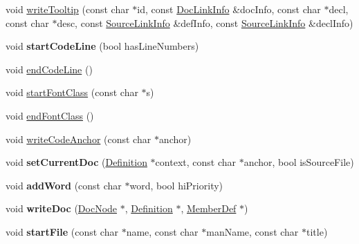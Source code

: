 \begin{DoxyCompactItemize}
void \mbox{\hyperlink{class_html_generator_ad21a9b170d8f644619f287a233c6b549}{write\+Tooltip}} (const char $\ast$id, const \mbox{\hyperlink{struct_doc_link_info}{Doc\+Link\+Info}} \&doc\+Info, const char $\ast$decl, const char $\ast$desc, const \mbox{\hyperlink{struct_source_link_info}{Source\+Link\+Info}} \&def\+Info, const \mbox{\hyperlink{struct_source_link_info}{Source\+Link\+Info}} \&decl\+Info)
\item 
\mbox{\label{class_html_generator_ab89f82b354a626585bf1ff5a793ad5db}} 
void {\bfseries start\+Code\+Line} (bool has\+Line\+Numbers)
\item 
void \mbox{\hyperlink{class_html_generator_a509e9b78f035f58e533cef4f79bf5401}{end\+Code\+Line}} ()
\item 
void \mbox{\hyperlink{class_html_generator_aa600cc24896060a68612e3db6efb7dbf}{start\+Font\+Class}} (const char $\ast$s)
\item 
void \mbox{\hyperlink{class_html_generator_aca25e58aa19b44b41de489dc966e4b5d}{end\+Font\+Class}} ()
\item 
void \mbox{\hyperlink{class_html_generator_a9e2528347c04b6f07dd9263441dbcf4f}{write\+Code\+Anchor}} (const char $\ast$anchor)
\item 
\mbox{\label{class_html_generator_a36829b23efe3855373db99bac3e9998d}} 
void {\bfseries set\+Current\+Doc} (\mbox{\hyperlink{class_definition}{Definition}} $\ast$context, const char $\ast$anchor, bool is\+Source\+File)
\item 
\mbox{\label{class_html_generator_ab80e35069bed2aadfd28912897ff59c8}} 
void {\bfseries add\+Word} (const char $\ast$word, bool hi\+Priority)
\item 
\mbox{\label{class_html_generator_afb2332948f5e53d82d8299fe158da0a9}} 
void {\bfseries write\+Doc} (\mbox{\hyperlink{class_doc_node}{Doc\+Node}} $\ast$, \mbox{\hyperlink{class_definition}{Definition}} $\ast$, \mbox{\hyperlink{class_member_def}{Member\+Def}} $\ast$)
\item 
\mbox{\label{class_html_generator_ab0a5eb800f902fc308dd418901bf8c0f}} 
void {\bfseries start\+File} (const char $\ast$name, const char $\ast$man\+Name, const char $\ast$title)
\item 
\mbox{\label{class_html_generator_a53e64fb26be1bf0e61e5f8d6fe1f1509}} 

\end{DoxyCompactItemize}
